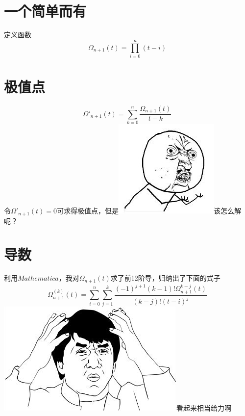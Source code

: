 \documentclass{article}
\begin{document}
\begin{CJK*}{UTF8}{gbsn}

\section*{一个简单而有}
定义函数
\[ \Omega_{n + 1}(t) = \prod\limits_{i = 0}^n (t - i) \]

\section{极值点}
\[ \Omega'_{n + 1}(t) = \sum_{k = 0}^n \frac{\Omega_{n + 1}(t)}{t - k} \]
令$\Omega'_{n + 1}(t) = 0$可求得极值点，但是\includegraphics[scale = 0.3]{bm12.jpg}该怎么解呢？

\section{导数}
利用$Mathematica$，我对$\Omega_{n + 1}(t)$求了前12阶导，归纳出了下面的式子
\[ \Omega^{(k)}_{n + 1}(t) = \sum_{i = 0}^n \sum_{j = 1}^k \frac{(-1)^{j + 1}(k - 1)!\Omega^{k - j}_{n + 1}(t)}{(k - j)!(t - i)^j} \]
\includegraphics[scale = 0.3]{bm21.jpg}看起来相当给力啊


\end{CJK*}
\end{document}
